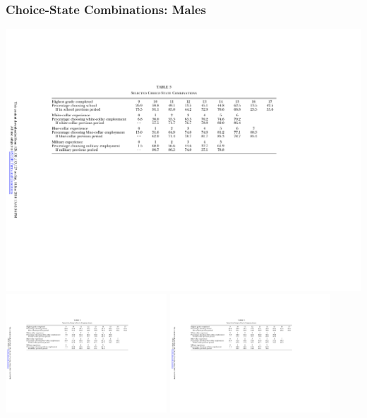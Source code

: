\begin{frame}
	\frametitle{Choice-State Combinations: Males}
	\includegraphics{tab-figs/table3_1997_header} \\
	\includegraphics[height=1.75in]{tab-figs/table3_1997_left} \includegraphics[height=1.75in]{tab-figs/table3a_1997}
\end{frame}

